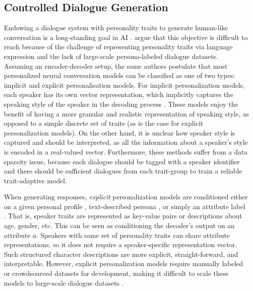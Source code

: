 \subsection{Controlled Dialogue Generation}


Endowing a dialogue system with personality traits to generate human-like conversation is a long-standing goal in AI \citep{edlund2008towards, scheutz2011toward, madotto-etal-2020-plug}. \cite{zheng2019personalized} argue that this objective is difficult to reach because of the challenge of representing personality traits via language expression and the lack of large-scale persona-labeled dialogue datasets. Assuming an encoder-decoder setup, the same authors postulate that most personalized neural conversation models can be classified as one of two types: implicit and explicit personalisation models. For implicit personalization models, each speaker has its own vector representation, which implicitly captures the speaking style of the speaker in the decoding process \citep{ijcai2017-521, li-etal-2016-persona}. These models enjoy the benefit of having a more granular and realistic representation of speaking style, as opposed to a simple discrete set of traits (as is the case for explicit personalization models). On the other hand, it is unclear how speaker style is captured and should be interpreted, as all the information about a speaker's style is encoded in a real-valued vector. Furthermore, these methods suffer from a data sparsity issue, because each dialogue should be tagged with a speaker identifier and there should be sufficient dialogues from each trait-group to train a reliable trait-adaptive model. 

When generating responses, \textit{explicit} personalization models are conditioned either on a given personal profile \citep{ijcai2018-595}, text-described persona \citep{zhang-etal-2018-personalizing}, or simply an attribute label \citep{madotto-etal-2020-plug}. That is, speaker traits are represented as key-value pairs or descriptions about age, gender, etc. This can be seen as conditioning the decoder's output on an attribute $a$. Speakers with same set of personality traits can share attribute representations, so it does not require a speaker-specific representation vector. Such structured character descriptions are more explicit, straight-forward, and interpretable. However, explicit personalization models require manually labeled or crowdsourced datasets for development, making it difficult to scale these models to large-scale dialogue datasets \cite{zheng2019personalized, madotto-etal-2020-plug}.

